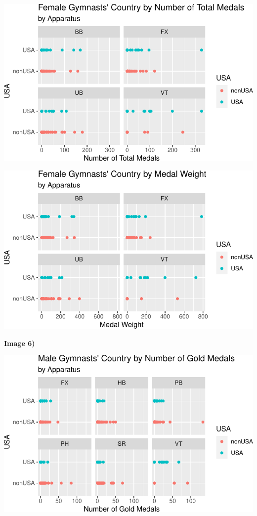 \documentclass[
  10.5pt,
  letterpaper,
  DIV=11,
  numbers=noendperiod]{scrartcl}
\begin{document}
\includegraphics{Main_files/figure-pdf/unnamed-chunk-5-2.pdf}

\includegraphics{Main_files/figure-pdf/unnamed-chunk-5-3.pdf}

\textbf{Image 6)}

\includegraphics{Main_files/figure-pdf/unnamed-chunk-6-1.pdf}
\end{document}
